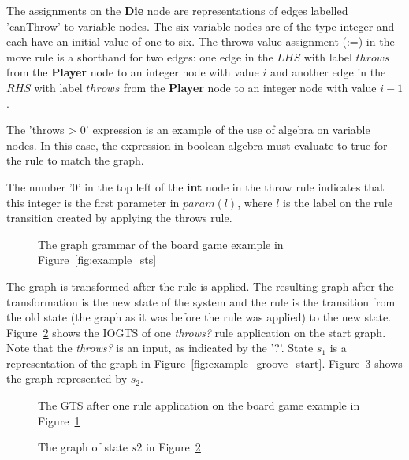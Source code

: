 The assignments on the \textbf{Die} node are representations of edges labelled 'canThrow' to variable nodes. The six variable nodes are of the type integer and each have an initial value of one to six. The throws value assignment (:=) in the move rule is a shorthand for two edges: one edge in the $\mathit{LHS}$ with label $throws$ from the \textbf{Player} node to an integer node with value $i$ and another edge in the $\mathit{RHS}$ with label $throws$ from the \textbf{Player} node to an integer node with value $i-1$. 

The 'throws > 0' expression is an example of the use of algebra on variable nodes. In this case, the expression in boolean algebra must evaluate to true for the rule to match the graph.

The number '0' in the top left of the \textbf{int} node in the throw rule indicates that this integer is the first parameter in $param(l)$, where $l$ is the label on the rule transition created by applying the throws rule.

\begin{figure}[ht]
  \begin{center}
    \quad
  \end{center}
  \caption{The graph grammar of the board game example in Figure~\ref{fig:example_sts}}
  \label{fig:example_groove}
\end{figure}

The graph is transformed after the rule is applied. The resulting graph after the transformation is the new state of the system and the rule is the transition from the old state (the graph as it was before the rule was applied) to the new state. Figure~\ref{fig:gts_example} shows the IOGTS of one \textit{throws?} rule application on the start graph. Note that the \textit{throws?} is an input, as indicated by the '?'. State $s_1$ is a representation of the graph in Figure~\ref{fig:example_groove_start}. Figure~\ref{fig:target_graph_state} shows the graph represented by $s_2$.

\begin{figure}[ht]
  \begin{center}
    
  \end{center}
  \caption{The GTS after one rule application on the board game example in Figure~\ref{fig:example_groove}}
  \label{fig:gts_example}
\end{figure}

\begin{figure}[ht]
  \begin{center}
    
  \end{center}
  \caption{The graph of state $s2$ in Figure~\ref{fig:gts_example}}
  \label{fig:target_graph_state}
\end{figure}
